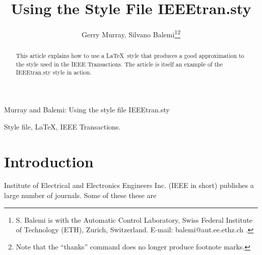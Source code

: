 
\def\BibTeX{{\rm B\kern-.05em{\sc i\kern-.025em b}\kern-.08em
    T\kern-.1667em\lower.7ex\hbox{E}\kern-.125emX}}

\newtheorem{theorem}{Theorem}
\setcounter{page}{100}



\title{Using the Style File IEEEtran.sty}

\author{Gerry Murray, Silvano Balemi\thanks{S. Balemi is with the
Automatic Control Laboratory, Swiss Federal Institute of Technology
(ETH), Zurich, Switzerland. E-mail: balemi@aut.ee.ethz.ch .}\thanks{Note
that the ``thanks'' command does no longer produce footnote marks.}}

{Murray and Balemi: Using the style file IEEEtran.sty}

\maketitle

\begin{abstract}
This article explains how to use a \LaTeX\ style that produces a good
approximation to the style used in the IEEE Transactions.  The article
is itself an example of the IEEEtran.sty style in action.
\end{abstract}

\begin{keywords}
Style file, \LaTeX, IEEE Transactions.
\end{keywords}

\section{Introduction}
 Institute of Electrical and Electronics Engineers
Inc. (IEEE in short) publishes a large number of journals.  Some of
these these are

